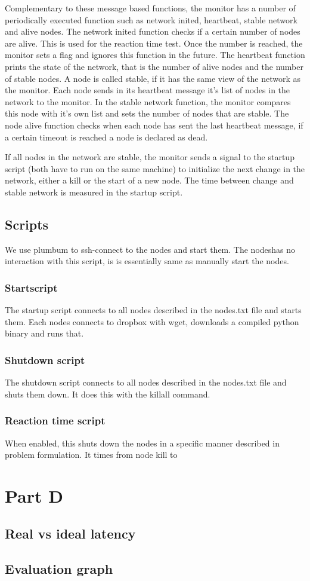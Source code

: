 \documentclass[paper=a4, fontsize=11pt]{scrartcl} %
\numberwithin{equation}{section} %
\numberwithin{figure}{section} %
\numberwithin{table}{section} %
\begin{document}
Complementary to these message based functions, the monitor has a number of periodically executed function such as network inited, heartbeat, stable network and alive nodes. The network inited function checks if a certain number of nodes are alive. This is used for the reaction time test. Once the number is reached, the monitor sets a flag and ignores this function in the future. The heartbeat function prints the state of the network, that is the number of alive nodes and the number of stable nodes. A node is called stable, if it has the same view of the network as the monitor. Each node sends in its heartbeat message it's list of nodes in the network to the monitor. In the stable network function, the monitor compares this node with it's own list and sets the number of nodes that are stable. The node alive function checks when each node has sent the last heartbeat message, if a certain timeout is reached a node is declared as dead.

If all nodes in the network are stable, the monitor sends a signal to the startup script (both have to run on the same machine) to initialize the next change in the network, either a kill or the start of a new node. The time between change and stable network is measured in the startup script.

\subsection{Scripts}
We use plumbum to ssh-connect to the nodes and start them. The nodeshas no interaction with this script, is is essentially same as manually start the nodes.
\subsubsection{Startscript}
The startup script connects to all nodes described in the nodes.txt file and starts them. Each nodes connects to dropbox with wget, downloads a compiled python binary and runs that. 

\subsubsection{Shutdown script}
The shutdown script connects to all nodes described in the nodes.txt file and shuts them down. It does this with the killall command.

\subsubsection{Reaction time script}
When enabled, this shuts down the nodes in a specific manner described in problem formulation. It times from node kill to 

\section{Part D}


\subsection{Real vs ideal latency}



\subsection{Evaluation graph}
\end{document}
